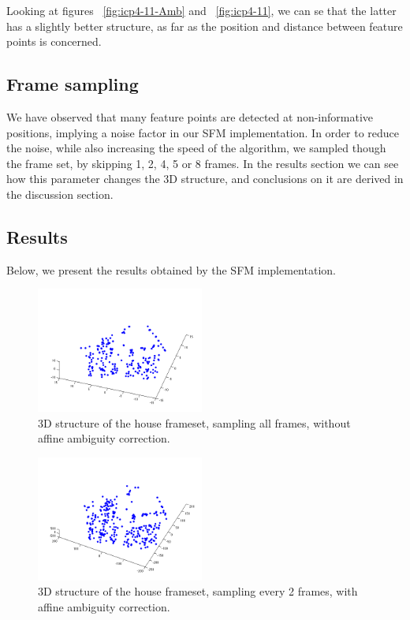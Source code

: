 Looking at figures ~\ref{fig:icp4-11-Amb} and ~\ref{fig:icp4-11}, we can se that the latter has a slightly better structure, as far as the position and distance between feature points is concerned. 

\subsection{Frame sampling}
We have observed that many feature points are detected at non-informative positions, implying a noise factor in our SFM implementation. In order to reduce the noise, while also increasing the speed of the algorithm, we sampled though the frame set, by skipping 1, 2, 4, 5 or 8 frames. In the results section we can see how this parameter changes the 3D structure, and conclusions on it are derived in the discussion section.


\subsection{Results}

Below, we present the results obtained by the SFM implementation. 

\begin{figure}[ht!]
  \centering
    \includegraphics[width=0.49\textwidth]{figures/icp1-46-Amb.png}
    \caption{3D structure of the house frameset, sampling all frames, without affine ambiguity correction.}
    \label{fig:icp1-46-Amb}
\end{figure}

\begin{figure}[ht!]
  \centering
    \includegraphics[width=0.49\textwidth]{figures/icp2-22.png}
    \caption{3D structure of the house frameset, sampling every 2 frames, with affine ambiguity correction.}
    \label{fig:icp2-22}
\end{figure}


